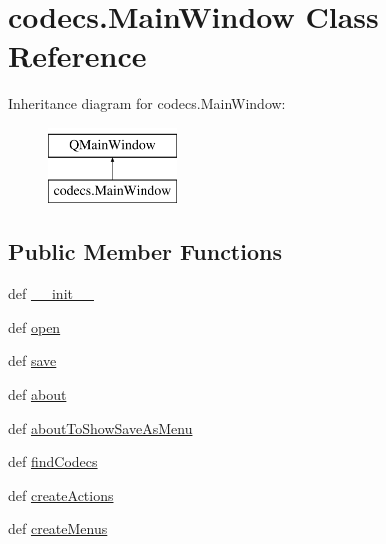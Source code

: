 \hypertarget{classcodecs_1_1MainWindow}{}\section{codecs.\+Main\+Window Class Reference}
\label{classcodecs_1_1MainWindow}
Inheritance diagram for codecs.\+Main\+Window\+:\begin{figure}[H]
\begin{center}
\leavevmode
\includegraphics[height=2.000000cm]{classcodecs_1_1MainWindow}
\end{center}
\end{figure}
\subsection*{Public Member Functions}
\begin{DoxyCompactItemize}
\item 
def \hyperlink{classcodecs_1_1MainWindow_ab8f64a78a04f5df23661c6db1ac6c1f2}{\+\_\+\+\_\+init\+\_\+\+\_\+}
\item 
def \hyperlink{classcodecs_1_1MainWindow_a5f04bf9df29fb447be17f0432fff29c4}{open}
\item 
def \hyperlink{classcodecs_1_1MainWindow_a3d35961aba4396b6b5040a44f44c905c}{save}
\item 
def \hyperlink{classcodecs_1_1MainWindow_aa5643340fbd0aaf8c9a8c810d84c24e0}{about}
\item 
def \hyperlink{classcodecs_1_1MainWindow_a6e2ed51919f65fb8623b936e372f82e9}{about\+To\+Show\+Save\+As\+Menu}
\item 
def \hyperlink{classcodecs_1_1MainWindow_a745767e32d76a04c43ff6ab2099db2d5}{find\+Codecs}
\item 
def \hyperlink{classcodecs_1_1MainWindow_ade89b0a7a54afbef51ed3aa1b1392fed}{create\+Actions}
\item 
def \hyperlink{classcodecs_1_1MainWindow_a6448616879765ad11d08b3071f10cea0}{create\+Menus}
\end{DoxyCompactItemize}
